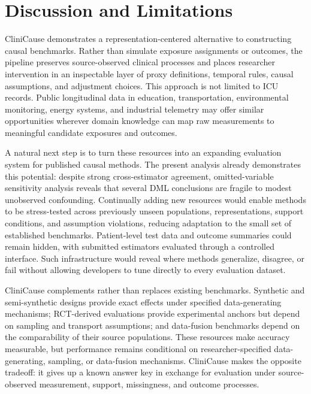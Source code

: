 \documentclass[letterpaper]{article}
\begin{document}
\section{Discussion and Limitations}

CliniCause demonstrates a representation-centered alternative to constructing
causal benchmarks. Rather than simulate exposure assignments or outcomes, the
pipeline preserves source-observed clinical processes and places researcher
intervention in an inspectable layer of proxy definitions, temporal rules,
causal assumptions, and adjustment choices. This approach is not limited to
ICU records. Public longitudinal data in education, transportation,
environmental monitoring, energy systems, and industrial telemetry may offer
similar opportunities wherever domain knowledge can map raw measurements to
meaningful candidate exposures and outcomes.

A natural next step is to turn these resources into an expanding evaluation
system for published causal methods. The present analysis already demonstrates
this potential: despite strong cross-estimator agreement, omitted-variable
sensitivity analysis reveals that several DML conclusions are fragile to modest
unobserved confounding. Continually adding new resources would enable methods
to be stress-tested across previously unseen populations, representations,
support conditions, and assumption violations, reducing adaptation to the
small set of established benchmarks. Patient-level test data and outcome
summaries could remain hidden, with submitted estimators evaluated through a
controlled interface. Such infrastructure would reveal where methods
generalize, disagree, or fail without allowing developers to tune directly to
every evaluation dataset.

CliniCause complements rather than replaces existing benchmarks. Synthetic and
semi-synthetic designs provide exact effects under specified data-generating
mechanisms; RCT-derived evaluations provide experimental anchors but depend on
sampling and transport assumptions; and data-fusion benchmarks depend on the
comparability of their source populations. These resources make accuracy
measurable, but performance remains conditional on researcher-specified
data-generating, sampling, or data-fusion mechanisms. CliniCause makes the
opposite tradeoff: it gives up a known answer key in exchange for evaluation
under source-observed measurement, support, missingness, and outcome processes.

\end{document}
